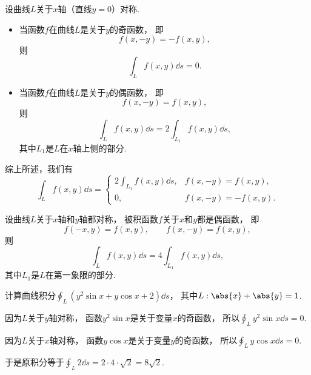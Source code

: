 设曲线\(L\)关于\(x\)轴（直线\(y=0\)）对称.
\begin{itemize}
	\item 当函数\(f\)在曲线\(L\)是关于\(y\)的奇函数，
	即\begin{equation*}
		f(x,-y) = -f(x,y),
	\end{equation*}
	则\begin{equation*}
		\int_L f(x,y) \dd{s} = 0.
	\end{equation*}

	\item 当函数\(f\)在曲线\(L\)是关于\(y\)的偶函数，
	即\begin{equation*}
		f(x,-y) = f(x,y),
	\end{equation*}
	则\begin{equation*}
		\int_L f(x,y) \dd{s}
		= 2 \int_{L_1} f(x,y) \dd{s},
	\end{equation*}
	其中\(L_1\)是\(L\)在\(x\)轴上侧的部分.
\end{itemize}
综上所述，我们有\begin{equation*}
	\int_L f(x,y) \dd{s}
	= \left\{ \begin{array}{cc}
		2 \int_{L_1} f(x,y) \dd{s}, & f(x,-y) = f(x,y), \\
		0, & f(x,-y) = -f(x,y).
	\end{array} \right.
\end{equation*}

设曲线\(L\)关于\(x\)轴和\(y\)轴都对称，
被积函数\(f\)关于\(x\)和\(y\)都是偶函数，
即\begin{equation*}
	f(-x,y) = f(x,y),
	\qquad
	f(x,-y) = f(x,y),
\end{equation*}
则\begin{equation*}
	\int_L f(x,y) \dd{s}
	= 4 \int_{L_1} f(x,y) \dd{s},
\end{equation*}
其中\(L_1\)是\(L\)在第一象限的部分.

\begin{example}
计算曲线积分\(\oint_L (y^2 \sin x + y \cos x + 2) \dd{s}\)，
其中\(L: \abs{x}+\abs{y}=1\).
\begin{solution}
因为\(L\)关于\(y\)轴对称，
函数\(y^2 \sin x\)是关于变量\(x\)的奇函数，
所以\(\oint_L y^2 \sin x \dd{s} = 0\).

因为\(L\)关于\(x\)轴对称，
函数\(y \cos x\)是关于变量\(y\)的奇函数，
所以\(\oint_L y \cos x \dd{s} = 0\).

于是原积分等于\(\oint_L 2 \dd{s} = 2\cdot4\cdot\sqrt2 = 8\sqrt2\).
\end{solution}
\end{example}

